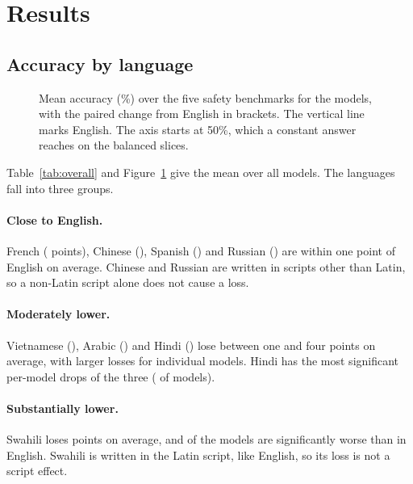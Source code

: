 \section{Results}
\label{sec:results}

\subsection{Accuracy by language}



\begin{figure}[t]
\centering

\caption{Mean accuracy (\%) over the five safety benchmarks for the
\MLnModels{} models, with the paired change from English in brackets. The
vertical line marks English. The axis starts at 50\%, which a constant answer
reaches on the balanced slices.}
\label{fig:lang}
\end{figure}

Table~\ref{tab:overall} and Figure~\ref{fig:lang} give the mean over all
\MLnModels{} models. The languages fall into three groups.

\paragraph{Close to English.} French (\MLdeltaFR{} points), Chinese
(\MLdeltaZH{}), Spanish (\MLdeltaES{}) and Russian (\MLdeltaRU{}) are within
one point of English on average. Chinese and Russian are written in scripts
other than Latin, so a non-Latin script alone does not cause a loss.

\paragraph{Moderately lower.} Vietnamese (\MLdeltaVI{}), Arabic (\MLdeltaAR{})
and Hindi (\MLdeltaHI{}) lose between one and four points on average, with
larger losses for individual models. Hindi has the most significant per-model
drops of the three (\MLsigNegHI{} of \MLnModels{} models).

\paragraph{Substantially lower.} Swahili loses \MLdeltaAbsSW{} points on average,
and \MLsigNegSW{} of the \MLnModels{} models are significantly worse than in
English. Swahili is written in the Latin script, like English, so its loss is
not a script effect.

